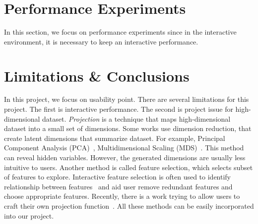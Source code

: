 \documentclass{article}
\begin{document}
\section{Performance Experiments}
In this section, we focus on performance experiments since in the interactive environment, it is necessary to keep an interactive performance. \\

\section{Limitations \& Conclusions}
In this project, we focus on usability point. There are several limitations for this project. The first is interactive performance. The second is project issue for high-dimensional dataset. \emph{Projection} is a technique that maps high-dimensional dataset into a small set of dimensions. Some works use dimension reduction, that create latent dimensions that summarize dataset. For example, Principal Component Analysis (PCA)~\cite{jolliffe2002principal}, Multidimensional Scaling (MDS)~\cite{mead1992review}. This method can reveal hidden variables. However, the generated dimensions are usually less intuitive to users. Another method is called feature selection, which selects subset of features to explore. Interactive feature selection is often used to identify relationship between features~\cite{guo2003coordinating, yang2004value} and aid user remove redundant features and choose appropriate features. Recently, there is a work trying to allow users to craft their own projection function~\cite{gleicher2013explainers}.  All these methods can be easily incorporated into our project.  \\



\end{document}
